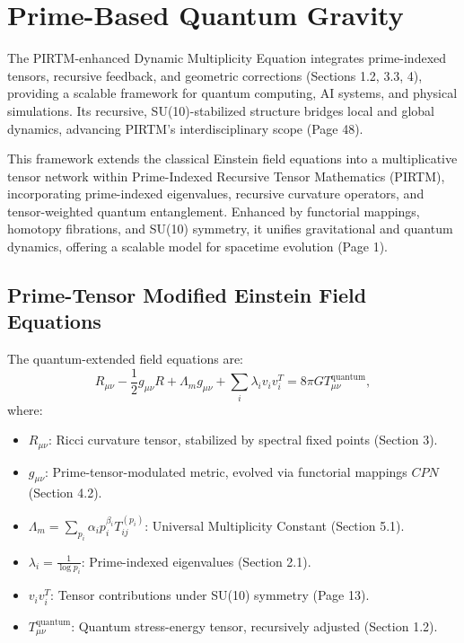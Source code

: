 \documentclass{article}
\theoremstyle{plain}
\begin{document}
\section{Prime-Based Quantum Gravity}
The PIRTM-enhanced Dynamic Multiplicity Equation integrates prime-indexed tensors, recursive feedback, and geometric corrections (Sections 1.2, 3.3, 4), providing a scalable framework for quantum computing, AI systems, and physical simulations. Its recursive, SU(10)-stabilized structure bridges local and global dynamics, advancing PIRTM’s interdisciplinary scope (Page 48).

This framework extends the classical Einstein field equations into a multiplicative tensor network within Prime-Indexed Recursive Tensor Mathematics (PIRTM), incorporating prime-indexed eigenvalues, recursive curvature operators, and tensor-weighted quantum entanglement. Enhanced by functorial mappings, homotopy fibrations, and SU(10) symmetry, it unifies gravitational and quantum dynamics, offering a scalable model for spacetime evolution (Page 1).

\subsection{Prime-Tensor Modified Einstein Field Equations}
The quantum-extended field equations are:
\begin{equation}
R_{\mu\nu} - \frac{1}{2} g_{\mu\nu} R + \Lambda_m g_{\mu\nu} + \sum_{i} \lambda_i v_i v_i^T = 8\pi G T_{\mu\nu}^{\text{quantum}},
\end{equation}
where:
\begin{itemize}
    \item \( R_{\mu\nu} \): Ricci curvature tensor, stabilized by spectral fixed points (Section 3).
    \item \( g_{\mu\nu} \): Prime-tensor-modulated metric, evolved via functorial mappings \( CPN \) (Section 4.2).
    \item \( \Lambda_m = \sum_{p_i} \alpha_i p_i^{\beta_i} T_{ij}^{(p_i)} \): Universal Multiplicity Constant (Section 5.1).
    \item \( \lambda_i = \frac{1}{\log p_i} \): Prime-indexed eigenvalues (Section 2.1).
    \item \( v_i v_i^T \): Tensor contributions under SU(10) symmetry (Page 13).
    \item \( T_{\mu\nu}^{\text{quantum}} \): Quantum stress-energy tensor, recursively adjusted (Section 1.2).
\end{itemize}
\end{document}
